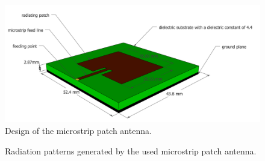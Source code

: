 \documentclass[twocolumn]{phdsymp} %
\begin{document}
\begin{figure}[h!]
\centering
  \includegraphics[width=\linewidth]{MicrostripAntenna.png}
  \caption{Design of the microstrip patch antenna.}
  \label{fig:basicpatchantenna}
\end{figure}

\begin{figure}[!htb]
\hfill
{}
  \caption{Radiation patterns generated by the used microstrip patch antenna.}
\label{fig:radpattern}
\end{figure}
\end{document}
